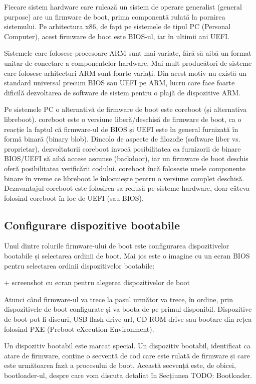 Fiecare sistem hardware care rulează un sistem de operare generalist (general
purpose) are un firmware de boot, prima componentă rulată la pornirea
sistemului. Pe arhitectura x86, de fapt pe sistemele de tipul PC (Personal
Computer), acest firmware de boot este BIOS-ul, iar în ultimii ani UEFI.

Sistemele care folosesc procesoare ARM sunt mai variate, fără să aibă un format
unitar de conectare a componentelor hardware. Mai mult producători de sisteme
care folosesc arhitecturi ARM sunt foarte variați. Din acest motiv nu există un
standard universal precum BIOS sau UEFI pe ARM, lucru care face foarte dificilă
dezvoltarea de software de sistem pentru o plajă de dispozitive ARM.

Pe sistemele PC o alternativă de firmware de boot este coreboot (și alternativa
libreboot). coreboot este o versiune liberă/deschisă de firmware de boot, ca o
reacție la faptul că firmware-ul de BIOS și UEFI este în general furnizată în
formă binară (binary blob). Dincolo de aspecte de filozofie (software liber vs.
proprietar), dezvoltatorii coreboot invocă posibilitatea ca furnizorii de binare
BIOS/UEFI să aibă accese ascunse (backdoor), iar un firmware de boot deschis
oferă posibilitatea verificării codului. coreboot încă folosește unele
componente binare în vreme ce libreboot le înlocuiește pentru o versiune complet
deschisă. Dezavantajul coreboot este folosirea sa redusă pe sisteme hardware,
doar câteva folosind coreboot în loc de UEFI (sau BIOS).

\subsection{Configurare dispozitive bootabile}
\label{sec:boot-firmware-devices}

Unul dintre rolurile firmware-ului de boot este configurarea dispozitivelor
bootabile și selectarea ordinii de boot. Mai jos este o imagine cu un ecran BIOS
pentru selectarea ordinii dispozitivelor bootabile:

+     screenshot cu ecran pentru alegerea dispozitivelor de boot

Atunci când firmware-ul va trece la pasul următor va trece, în ordine, prin
dispozitivele de boot configurate și va boota de pe primul disponibil.
Dispozitive de boot pot fi discuri, USB flash drive-url, CD ROM-drive sau
bootare din rețea folosind PXE (Preboot eXecution Environment).

Un dispozitiv bootabil este marcat special. Un dispozitiv bootabil, identificat
ca atare de firmware, conține o secvență de cod care este rulată de firmware și
care este următoarea fază a procesului de boot. Această secvență este, de
obicei, bootloader-ul, despre care vom discuta detaliat în Secțiunea TODO:
Bootloader.


